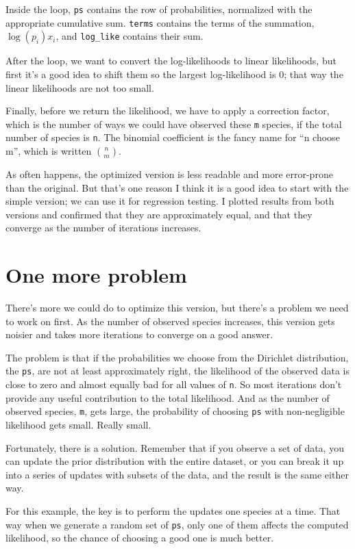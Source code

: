 \documentclass[12pt]{book}
\begin{document}
Inside the loop, {\tt ps} contains the row of probabilities, normalized
with the appropriate cumulative sum.  {\tt terms} contains the
terms of the summation, $\log(p_i) x_i$, and \verb"log_like" contains
their sum.

After the loop, we want to convert the log-likelihoods to linear
likelihoods, but first it's a good idea to shift them so the largest
log-likelihood is 0; that way the linear likelihoods are not too
small.

Finally, before we return the likelihood, we have to apply a correction
factor, which is the number of ways we could have observed these {\tt m}
species, if the total number of species is {\tt n}.  The binomial
coefficient is the fancy name for ``n choose m'', which is written
$\binom{n}{m}$. 

As often happens, the optimized version is less readable and more
error-prone than the original.  But that's one reason I think it is
a good idea to start with the simple version; we can use it for
regression testing.  I plotted results from both versions and confirmed
that they are approximately equal, and that they converge as the
number of iterations increases.


\section{One more problem}

There's more we could do to optimize this version, but there's a 
problem we need to work on first.  As the number of observed
species increases, this version gets noisier and takes more
iterations to converge on a good answer.

The problem is that if the probabilities we choose from the Dirichlet
distribution, the {\tt ps}, are not at least approximately right,
the likelihood of the observed data is close to zero and almost
equally bad for all values of {\tt n}.  So most iterations don't
provide any useful contribution to the total likelihood.  And as the
number of observed species, {\tt m}, gets large, the probability of
choosing {\tt ps} with non-negligible likelihood gets small.  Really
small.

Fortunately, there is a solution.  Remember that if you observe
a set of data, you can update the prior distribution with the
entire dataset, or you can break it up into a series of updates
with subsets of the data, and the result is the same either way.

For this example, the key is to perform the updates one species at
a time.  That way when we generate a random set of {\tt ps}, only
one of them affects the computed likelihood, so the chance of choosing
a good one is much better.
\end{document}
